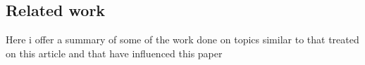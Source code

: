 \begin{comment}
En esta sección se espera que el autor describa en forma más amplia a como
se presentó en el {\it Resumen}, algunos aspectos como el contexto de la
investigación, el problema a resolver, la forma propuesta de resolver, algunos
antecedentes, entre otros.

Los puntos importantes en la {\it Introducción} son:
\begin{itemize}
	\item Introducción al contexto donde se va a realizar la propuesta
	\item Determinar la situación problemática 
	\item Definir el problema y los factores y aspectos más importantes que intervienen  en el problema
	\item Justificar por qué es importante resolver ese problema
 Michael: Hasta aqui es pareciod a lo de definicion de problema. M
	\item Explicar lo qué se ha hecho para resolver ese problema
	\item Describir el modelo de solución del problema
	\item Establecer los posibles logros en la solución del problema
	\item Describir la organización del documento
\end{itemize}

{\bf Ejemplo de Cita Bibliográfica:}

En años recientes se ha manifestado interés en el área de Algoritmos Genéticos
con la Teoría de Dificultad
Walsh polynomials \cite{Clear2}....... \\


{\bf No olviden incluir en donde corresponde
 la motivación, la justificación, el alcance de la
investigación, los recursos y las suposiciones...}
\end{comment}

\subsection{Related work}
Here i offer a summary of some of the work done on topics similar to that treated on this article and that have influenced this paper


